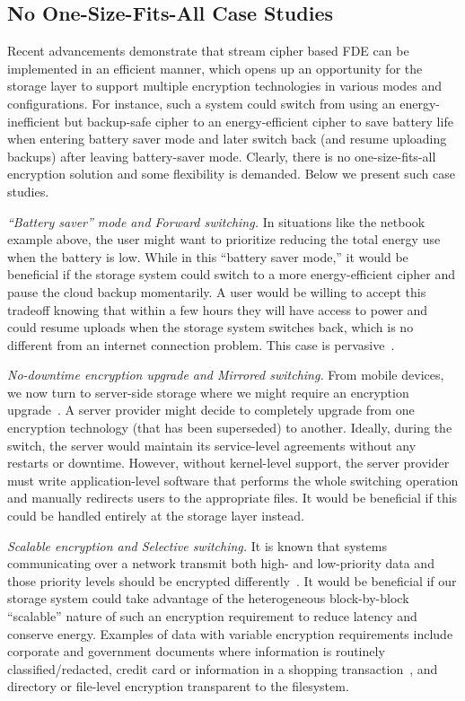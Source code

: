 \subsection{No One-Size-Fits-All Case Studies}

Recent advancements demonstrate that stream cipher based FDE can be implemented
in an efficient manner, which opens up an opportunity for the storage layer to
support multiple encryption technologies in various modes and configurations.
For instance, such a system could switch from using an energy-inefficient but
backup-safe cipher to an energy-efficient cipher to save battery life when
entering battery saver mode and later switch back (and resume uploading backups)
after leaving battery-saver mode. Clearly, there is no one-size-fits-all
encryption solution and some flexibility is demanded. Below we present \numCases
such case studies.

{\em ``Battery saver'' mode and Forward switching.} In situations like the
netbook example above, the user might want to prioritize reducing the total
energy use when the battery is low. While in this ``battery saver mode,'' it
would be beneficial if the storage system could switch to a more
energy-efficient cipher and pause the cloud backup momentarily. A user would be
willing to accept this tradeoff knowing that within a few hours they will have
access to power and could resume uploads when the storage system switches back,
which is no different from an internet connection problem. This case is
pervasive~\cite{battery-saver1, battery-saver2, battery-saver3, battery-saver4,
battery-saver5}.

{\em No-downtime encryption upgrade and Mirrored switching.} From mobile
devices, we now turn to server-side storage where we might require an encryption
upgrade~\cite{upgrade-encryption1,upgrade-encryption2,upgrade-encryption3}. A
server provider might decide to completely upgrade from one encryption
technology (\eg that has been superseded) to another. Ideally, during the
switch, the server would maintain its service-level agreements without any
restarts or downtime. However, without kernel-level support, the server provider
must write application-level software that performs the whole switching
operation and manually redirects users to the appropriate files. It would be
beneficial if this could be handled entirely at the storage layer instead.

{\em Scalable encryption and Selective switching.} It is known that systems
communicating over a network transmit both high- and low-priority data and those
priority levels should be encrypted differently~\cite{ScalableSecurity}. It
would be beneficial if our storage system could take advantage of the
heterogeneous block-by-block ``scalable'' nature of such an encryption
requirement to reduce latency and conserve energy. Examples of data with
variable encryption requirements include corporate and government documents
where information is routinely classified/redacted, credit card or information
in a shopping transaction~\cite{ScalableSecurity}, and directory or file-level
encryption transparent to the filesystem.
